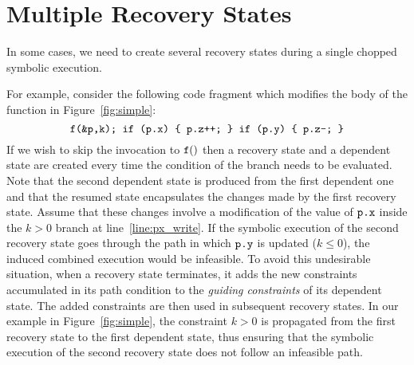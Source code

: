 
\section{Multiple Recovery States}
\label{Se:MultiRecovery}
In some cases, we need to create several recovery states during a
single chopped symbolic execution.

For example, consider the following code fragment which modifies the
body of the  function in Figure~\ref{fig:simple}:
\[
\texttt{f(\&p,k); if (p.x) \{ p.z++; \} if (p.y) \{ p.z--; \}}
\]
If we wish to skip the invocation to $\texttt{f}()$ then a recovery
state and a dependent state are created every time the condition of
the branch needs to be evaluated. Note that the second dependent state
is produced from the first dependent one and that the resumed state
encapsulates the changes made by the first recovery state. Assume that
these changes involve a modification of the value of $\texttt{p.x}$
inside the $k>0$ branch at line~\ref{line:px_write}. If the symbolic
execution of the second recovery state goes through the path in which
$\texttt{p.y}$ is updated ($k\le0$), the induced combined execution
would be infeasible. To avoid this undesirable situation, when a
recovery state terminates, it adds the new constraints accumulated in
its path condition to the \textit{guiding constraints} of its dependent state. The added
constraints are then used in subsequent recovery states. In our
example in Figure~\ref{fig:simple}, the constraint $k > 0$ is
propagated from the first recovery state to the first dependent state,
thus ensuring that the symbolic execution of the second recovery state
does not follow an infeasible path.

